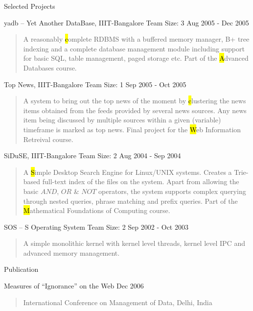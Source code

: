 \documentclass{resume}
\newcommand{\teamsize}{\hfill\sc\footnotesize Team Size: }
\begin{document}
\begin{category}{Selected Projects}{}
    \item {\topic yadb -- Yet Another DataBase,} IIIT-Bangalore
        {\teamsize 3}
        {\period Aug 2005 - Dec 2005}
        \begin{quote}
            A reasonably {\hl complete RDBMS} with a buffered memory manager,
            B+ tree indexing and a complete database management module
            including support for basic SQL, table management, paged storage
            etc. Part of the {\hl Advanced Databases} course.
        \end{quote}

    \item {\topic Top News,} IIIT-Bangalore
        {\teamsize 1}
        {\period Sep 2005 - Oct 2005}
        \begin{quote}
            A system to bring out the top news of the moment by {\hl clustering
            the news items} obtained from the feeds provided by several news
            sources. Any news item being discussed by multiple sources within a
            given (variable) timeframe is marked as top news. Final project
            for the {\hl Web Information Retreival} course.
        \end{quote}

    \item {\topic SiDuSE,} IIIT-Bangalore
        {\teamsize 2}
        {\period Aug 2004 - Sep 2004}
        \begin{quote}
            A {\hl Simple Desktop Search Engine} for Linux/UNIX systems.
            Creates a Trie-based full-text index of the files on the system.
            Apart from allowing the basic $AND$, $OR$ \& $NOT$ operators, the
            system supports complex querying through nested queries, phrase
            matching and prefix queries. Part of the {\hl Mathematical
            Foundations of Computing} course.
        \end{quote}

    \item {\topic SOS -- S Operating System}
        {\teamsize 2}
        {\period Sep 2002 - Oct 2003}
        \begin{quote}
            A simple monolithic kernel with kernel level threads, kernel level
            IPC and advanced memory management.
        \end{quote}

\end{category}


\begin{category}{Publication}{}

    \item {\topic Measures of ``Ignorance'' on the Web}
        {\period Dec 2006}
        \begin{quote}
            International Conference on Management of Data, Delhi, India
        \end{quote}

\end{category}
\end{document}
